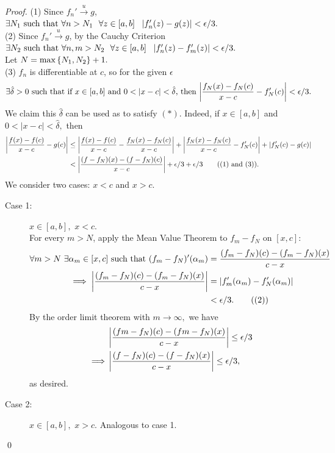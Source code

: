 \begin{proof}
    (1) Since $f_n' \overset{u}{\to} g$,  $\exists N_1 \text{ such that } \forall n > N_1 ~~\forall z \in [a,b] ~~ \left|f_n'(z) - g(z)\right| < \epsilon / 3.$ \\
    (2) Since $f_n' \overset{u}{\to} g$, by the Cauchy Criterion $\exists N_2 \text{ such that } \forall n,m > N_2 ~~\forall z \in [a,b] ~~\left|f_n'(z) - f_m'(z)\right| < \epsilon / 3.$ \\
    Let $N = \max\left\{N_1, N_2\right\} +1.$ \\
    (3) $f_n$ is differentiable at $c$, so for the given $\epsilon$
    \[
        \exists \hat{\delta} > 0 \text{ such that } \text{if $x \in [a,b]$ and $0 < |x-c| < \hat{\delta}$, then $\left|\frac{f_N(x) - f_N(c)}{x - c}-f_N'(c)\right| < \epsilon / 3.$}    
    \]
    We claim this $\hat{\delta}$ can be used as to satisfy $(*)$. Indeed, if $x \in [a,b]$ and $0 < |x-c| < \hat{\delta},$ then 
    \begin{align*}
        \left|\frac{f(x) - f(c)}{x - c} - g(c)\right| &\leq \left|\frac{f(x) - f(c)}{x - c} - \frac{f_N(x) - f_N(c)}{x - c}\right| + \left|\frac{f_N(x) - f_N(c)}{x - c}-f_N'(c)\right| + \left|f_N'(c) - g(c)\right| \\
        &< \left|\frac{(f-f_N)(x) - (f-f_N)(c)}{x - c}\right| + \epsilon/3 + \epsilon / 3 \tag{(1) and (3)}.
    \end{align*}
    We consider two cases: $x < c$ and $x > c$.

    \begin{description}
        \item[Case 1: ] $x\in [a,b],$ $x< c$.\\
        For every $m > N$, apply the Mean Value Theorem to $f_m - f_N$ on $[x,c]$:
        \begin{align*}
            \forall m > N ~\exists \alpha_m \in [x,c] \text{ such that } (f_m-f_N)'(\alpha_m) &= \frac{(f_m-f_N)(c) - (f_m-f_N)(x)}{c - x} \\
            \implies \left|\frac{(f_m-f_N)(c) - (f_m-f_N)(x)}{c - x}\right| &= \left|f_m'(\alpha_m)-f_N'(\alpha_m)\right| \\
            &< \epsilon / 3. \tag{(2)}
        \end{align*}
        By the order limit theorem with $m \to \infty,$ we have
        \begin{align*}
            &\left|\frac{(fm-f_N)(c) - (fm-f_N)(x)}{c - x}\right| \leq \epsilon / 3 \\
            \implies &\left|\frac{(f-f_N)(c) - (f-f_N)(x)}{c - x}\right| \leq \epsilon / 3,
        \end{align*}
        as desired.

        \item[Case 2: ] $x\in[a,b],$ $x > c.$
        Analogous to case 1.
    \end{description}
    \qed
\end{proof}

